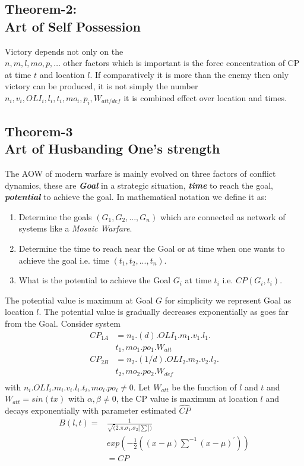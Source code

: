 \documentclass[]{article}
\begin{document}
\subsection{Theorem-2:\\Art of Self Possession}
Victory depends not only on the \\$n,m,l,mo,p,\dots$ other factors which is important is the force concentration of CP at time $t$ and location $l$. If comparatively it is more than the enemy then only victory can be produced, it is not simply the number $n_i,v_i,OLI_i,l_i,t_i,mo_i,p_i,W_{att/def}$ it is combined effect over location and times.
\newpage
\subsection{Theorem-3\\Art of Husbanding One's strength}
The AOW of modern warfare is mainly evolved on three factors of conflict dynamics, these are \textbf{\textit{Goal}} in a strategic situation, \textbf{\textit{time}} to reach the goal, \textbf{\textit{potential}} to achieve the goal. In mathematical notation we define it as:
\begin{enumerate}
    \item Determine the goals $({G_1,G_2,...,G_n})$ which are connected as network of systems like a {} \textit{\Gls{Mosaic Warfare}}. 
    \item Determine the time to reach near the Goal or at time when one wants to achieve the goal i.e. time $(t_1,t_2,...,t_n)$.
    \item What is the potential to achieve the Goal ${G_i}$ at time $t_i$ i.e. ${CP(G_i,t_i)}$.
    
\end{enumerate}

The potential value is maximum at Goal $G$ for simplicity we represent Goal as location $l$. The potential value is gradually decreases exponentially as goes far from the Goal. Consider system
\begin{equation}
\begin{split}
    CP_{1A}&=n_1.(d).OLI_1.m_1.v_1.l_1.\\&t_1,mo_1.po_1.W_{att}\\
    CP_{2B}&=n_2.(1/d).OLI_2.m_2.v_2.l_2.\\&t_2,mo_2.po_2.W_{def}\\
\end{split}
\end{equation}
with $n_i.OLI_i.m_i.v_i.l_i.t_i,mo_i.po_i\neq 0$. Let $W_{att}$ be the function of $l$ and $t$ and $W_{att}=sin(tx)$ with $\alpha,\beta \neq 0 $, the CP value is maximum at location $l$ and decays exponentially with parameter estimated $\hat{CP}$
\begin{equation}
\begin{split}
    B(l,t)=&\frac{1}{\sqrt(2.\pi.\sigma_1.\sigma_2|\sum|)}\\&exp(-\frac{1}{2}((x-\mu){{\sum^{-1}}}(x-\mu)^{'} ))\\&=CP
\end{split}
\end{equation}
\end{document}
